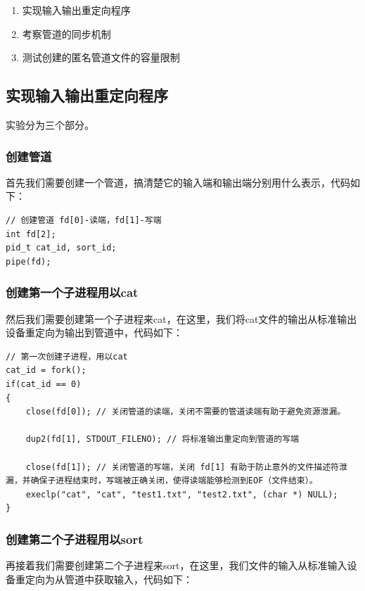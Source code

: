 \documentclass{LabReport}
\begin{document}
	\begin{enumerate}
		\item 实现输入输出重定向程序
		\item 考察管道的同步机制
		\item 测试创建的匿名管道文件的容量限制
	\end{enumerate}
	
	\subsection{实现输入输出重定向程序}
	
	实验分为三个部分。
	\subsubsection{创建管道}
	
	首先我们需要创建一个管道，搞清楚它的输入端和输出端分别用什么表示，代码如下：
	
\begin{lstlisting}
// 创建管道 fd[0]-读端，fd[1]-写端
int fd[2];
pid_t cat_id, sort_id;
pipe(fd);
\end{lstlisting}

	\subsubsection{创建第一个子进程用以cat}
	
	然后我们需要创建第一个子进程来cat，在这里，我们将cat文件的输出从标准输出设备重定向为输出到管道中，代码如下：
	
\begin{lstlisting}
// 第一次创建子进程，用以cat
cat_id = fork();
if(cat_id == 0)
{
    close(fd[0]); // 关闭管道的读端，关闭不需要的管道读端有助于避免资源泄漏。
	
    dup2(fd[1], STDOUT_FILENO); // 将标准输出重定向到管道的写端
	
    close(fd[1]); // 关闭管道的写端，关闭 fd[1] 有助于防止意外的文件描述符泄漏，并确保子进程结束时，写端被正确关闭，使得读端能够检测到EOF（文件结束）。
    execlp("cat", "cat", "test1.txt", "test2.txt", (char *) NULL);
}
\end{lstlisting}

	\subsubsection{创建第二个子进程用以sort}
再接着我们需要创建第二个子进程来sort，在这里，我们文件的输入从标准输入设备重定向为从管道中获取输入，代码如下：
\end{document}
